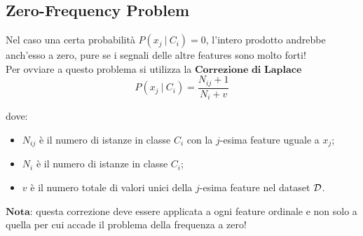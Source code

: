     \subsection{Zero-Frequency Problem}
        Nel caso una certa probabilità $P \left( x_{j}\ |\ C_{i} \right) = 0$, l'intero prodotto andrebbe anch'esso a zero, pure se i segnali delle altre features sono molto forti!
        \\
        Per ovviare a questo problema si utilizza la $\textbf{Correzione di Laplace}$
            $$ P(x_{j}\ |\ C_{i}) = \frac{N_{ij} + 1}{N_{i} + v} $$

        dove:
            \begin{itemize}
                \item $N_{ij}$ è il numero di istanze in classe $C_{i}$ con la $j$-esima feature uguale a $x_{j}$;
                \item $N_{i}$ è il numero di istanze in classe $C_{i}$;
                \item $v$ è il numero totale di valori unici della $j$-esima feature nel dataset $\cal D$.
            \end{itemize}

        $\textbf{Nota:}$ questa correzione deve essere applicata a ogni feature ordinale e non solo a quella per cui accade il problema della frequenza a zero!

    \clearpage